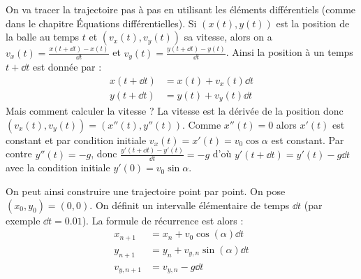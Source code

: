 \documentclass[11pt,class=report,crop=false]{standalone}
\begin{document}
 On va tracer la trajectoire pas à pas en utilisant les éléments différentiels (comme dans le chapitre \og{}Équations différentielles\fg). Si $(x(t) , y(t))$ est la position de la balle au temps $t$ et $(v_x(t), v_y(t))$ sa vitesse, alors on a $v_x(t) = \frac{x(t + \dd t) - x(t)}{\dd t}$ et $v_y(t) = \frac{y(t + \dd t) - y(t)}{\dd t}$.  
Ainsi la position à un temps $t + \dd t$ est donnée par :
\begin{align*}
    x(t + \dd t) &= x(t) + v_x(t) \dd t \\
    y(t + \dd t) &= y(t) + v_y(t) \dd t
\end{align*}
Mais comment calculer la vitesse ? La vitesse est la dérivée de la position donc $(v_x(t), v_y(t)) = (x''(t), y''(t))$.
Comme $x''(t)=0$ alors $x'(t)$ est constant et par condition initiale $v_x(t) = x'(t) = v_0 \cos \alpha$ est constant.
Par contre $y''(t) = -g$, donc $\frac{y'(t + \dd t) - y'(t)}{\dd t} = -g$ d'où $y'(t + \dd t) = y'(t) - g \dd t$ avec la condition initiale $y'(0) = v_0 \sin \alpha$.

On peut ainsi construire une trajectoire point par point.
On pose $(x_0, y_0) = (0, 0)$. On définit un intervalle élémentaire de temps $\dd t$ (par exemple $\dd t = 0.01$).  La formule de récurrence est alors :
\begin{align*}
    x_{n+1} &= x_n + v_0  \cos(\alpha) \dd t \\
    y_{n+1} &= y_n + v_{y,n} \sin(\alpha) \dd t \\
    v_{y,n+1} &= v_{y,n} - g \dd t
\end{align*}

\bigskip
\end{document}

